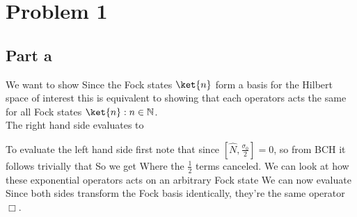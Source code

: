 \section*{Problem 1}
\subsection*{Part a}
We want to show
Since the Fock states $\ket{n}$ form a basis for the Hilbert space of interest this is equivalent to showing that each operators acts the same for all Fock states $\ket{n}: n \in \mathbb{N}$.\\

The right hand side evaluates to

To evaluate the left hand side first note that since $\left[ \hat{N}, \frac{\sigma_0}{2} \right]=0$, so from BCH it follows trivially that
So we get
Where the $\frac{1}{2}$ terms canceled. We can look at how these exponential operators acts on an arbitrary Fock state
We can now evaluate
Since both sides transform the Fock basis identically, they're the same operator $\Box$.

